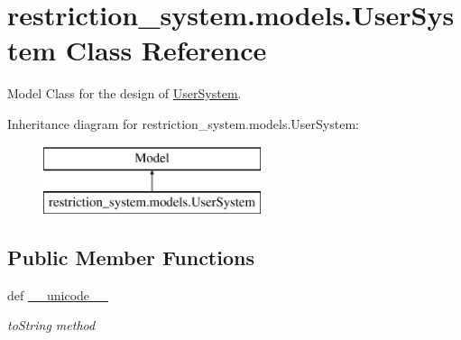 \hypertarget{classrestriction__system_1_1models_1_1UserSystem}{}\section{restriction\+\_\+system.\+models.\+User\+System Class Reference}
\label{classrestriction__system_1_1models_1_1UserSystem}


Model Class for the design of \hyperlink{classrestriction__system_1_1models_1_1UserSystem}{User\+System}.  


Inheritance diagram for restriction\+\_\+system.\+models.\+User\+System\+:\begin{figure}[H]
\begin{center}
\leavevmode
\includegraphics[height=2.000000cm]{classrestriction__system_1_1models_1_1UserSystem}
\end{center}
\end{figure}
\subsection*{Public Member Functions}
\begin{DoxyCompactItemize}
\item 
def \hyperlink{classrestriction__system_1_1models_1_1UserSystem_a1f93de0d7eb4be00db2fb67b7a3d7cd0}{\+\_\+\+\_\+unicode\+\_\+\+\_\+}
\begin{DoxyCompactList}\small\item\em to\+String method \end{DoxyCompactList}\end{DoxyCompactItemize}
